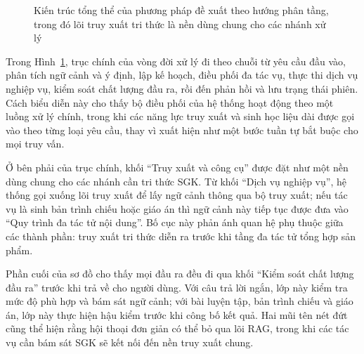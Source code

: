 \documentclass[../DoAn.tex]{subfiles}
\begin{document}
\begin{figure}[!htbp]
{
    }
    \caption{Kiến trúc tổng thể của phương pháp đề xuất theo hướng phân tầng, trong đó lõi truy xuất tri thức là nền dùng chung cho các nhánh xử lý}
    \label{fig:method-overall-architecture}
\end{figure}

Trong Hình~\ref{fig:method-overall-architecture}, trục chính của vòng đời xử lý đi theo chuỗi từ yêu cầu đầu vào, phân tích ngữ cảnh và ý định, lập kế hoạch, điều phối đa tác vụ, thực thi dịch vụ nghiệp vụ, kiểm soát chất lượng đầu ra, rồi đến phản hồi và lưu trạng thái phiên. Cách biểu diễn này cho thấy bộ điều phối của hệ thống hoạt động theo một luồng xử lý chính, trong khi các năng lực truy xuất và sinh học liệu dài được gọi vào theo từng loại yêu cầu, thay vì xuất hiện như một bước tuần tự bắt buộc cho mọi truy vấn.

Ở bên phải của trục chính, khối ``Truy xuất và công cụ'' được đặt như một nền dùng chung cho các nhánh cần tri thức SGK. Từ khối ``Dịch vụ nghiệp vụ'', hệ thống gọi xuống lõi truy xuất để lấy ngữ cảnh thông qua bộ truy xuất; nếu tác vụ là sinh bản trình chiếu hoặc giáo án thì ngữ cảnh này tiếp tục được đưa vào ``Quy trình đa tác tử nội dung''. Bố cục này phản ánh quan hệ phụ thuộc giữa các thành phần: truy xuất tri thức diễn ra trước khi tầng đa tác tử tổng hợp sản phẩm.

Phần cuối của sơ đồ cho thấy mọi đầu ra đều đi qua khối ``Kiểm soát chất lượng đầu ra'' trước khi trả về cho người dùng. Với câu trả lời ngắn, lớp này kiểm tra mức độ phù hợp và bám sát ngữ cảnh; với bài luyện tập, bản trình chiếu và giáo án, lớp này thực hiện hậu kiểm trước khi công bố kết quả. Hai mũi tên nét đứt cũng thể hiện rằng hội thoại đơn giản có thể bỏ qua lõi RAG, trong khi các tác vụ cần bám sát SGK sẽ kết nối đến nền truy xuất chung.
\end{document}
